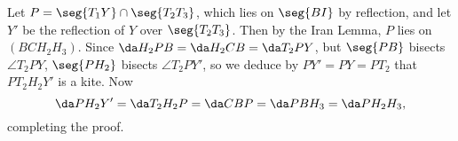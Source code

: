 Let $P=\seg{T_1Y}\cap\seg{T_2T_3}$, which lies on $\seg{BI}$ by reflection, and let $Y'$ be the reflection of $Y$ over $\seg{T_2T_3}$. Then by the Iran Lemma, $P$ lies on $(BCH_2H_3)$. Since $\da H_2PB=\da H_2CB=\da T_2PY$, but $\seg{PB}$ bisects $\angle T_2PY$, $\seg{PH_2}$ bisects $\angle T_2PY'$, so we deduce by $PY'=PY=PT_2$ that $PT_2H_2Y'$ is a kite. Now \[\da PH_2Y'=\da T_2H_2P=\da CBP=\da PBH_3=\da PH_2H_3,\]
completing the proof.

